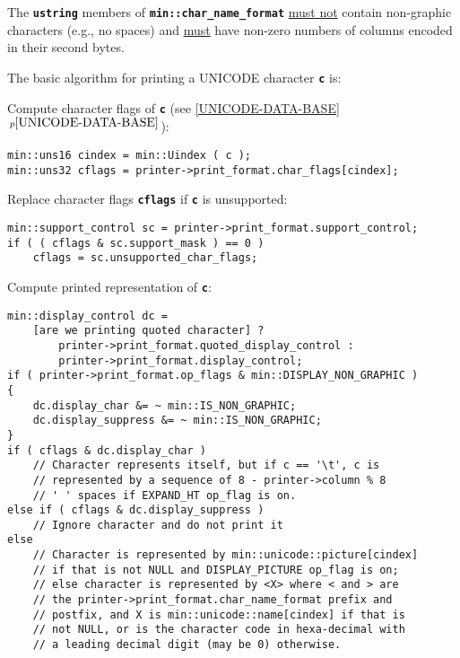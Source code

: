 \documentclass[12pt]{article}
\newcommand{\TT}[1]{{\tt \bfseries #1}}
\newcommand{\itemref}[1]{\ref{#1}$\,^{p\pageref{#1}}$}
\newenvironment{indpar}[1][0.3in]%
	{\begin{list}{}%
		     {\setlength{\itemsep}{0in}%
		      \setlength{\topsep}{0in}%
		      \setlength{\parsep}{1ex}%
		      \setlength{\labelwidth}{#1}%
		      \setlength{\leftmargin}{#1}%
		      \addtolength{\leftmargin}{\labelsep}}%
	 \item}%
	{\end{list}}
\begin{document}
The \TT{ustring} members of \TT{min::char\_name\_format} \underline{must not}
contain non-graphic characters (e.g., no spaces) and \underline{must}
have non-zero numbers of columns encoded in their second bytes.

The basic algorithm for printing a UNICODE character \TT{c} is:

\begin{enumerate}

\item Compute character flags of \TT{c} (see \itemref{UNICODE-DATA-BASE}):%
\label{COMPUTE-CHARACTER-FLAGS}
\begin{indpar}\begin{verbatim}
min::uns16 cindex = min::Uindex ( c );
min::uns32 cflags = printer->print_format.char_flags[cindex];
\end{verbatim}\end{indpar}

\item Replace character flags \TT{cflags} if \TT{c} is unsupported:%
\label{REPLACE-CHARACTER-FLAGS}
\begin{indpar}\begin{verbatim}
min::support_control sc = printer->print_format.support_control;
if ( ( cflags & sc.support_mask ) == 0 )
    cflags = sc.unsupported_char_flags;
\end{verbatim}\end{indpar}

\item Compute printed representation of \TT{c}:%
\label{COMPUTE-PRINTED-REPRESENTATION}
\begin{indpar}\begin{verbatim}
min::display_control dc =
    [are we printing quoted character] ?
        printer->print_format.quoted_display_control :
        printer->print_format.display_control;
if ( printer->print_format.op_flags & min::DISPLAY_NON_GRAPHIC )
{
    dc.display_char &= ~ min::IS_NON_GRAPHIC;
    dc.display_suppress &= ~ min::IS_NON_GRAPHIC;
}
if ( cflags & dc.display_char )
    // Character represents itself, but if c == '\t', c is
    // represented by a sequence of 8 - printer->column % 8
    // ' ' spaces if EXPAND_HT op_flag is on.
else if ( cflags & dc.display_suppress )
    // Ignore character and do not print it
else
    // Character is represented by min::unicode::picture[cindex]
    // if that is not NULL and DISPLAY_PICTURE op_flag is on;
    // else character is represented by <X> where < and > are
    // the printer->print_format.char_name_format prefix and
    // postfix, and X is min::unicode::name[cindex] if that is
    // not NULL, or is the character code in hexa-decimal with
    // a leading decimal digit (may be 0) otherwise.
\end{verbatim}\end{indpar}


\end{enumerate}
\end{document}

